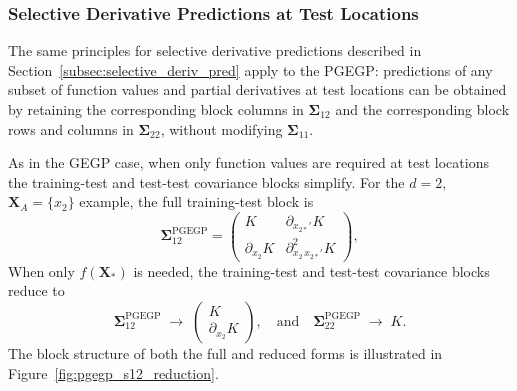 \documentclass[12pt]{article}
\begin{document}
\subsubsection{Selective Derivative Predictions at Test Locations}
\label{subsubsec:pgegp_selective_pred}

The same principles for selective derivative predictions described in Section~\ref{subsec:selective_deriv_pred} apply to the PGEGP: predictions of any subset of function values and partial derivatives at test locations can be obtained by retaining the corresponding block columns in $\boldsymbol{\Sigma}_{12}$ and the corresponding block rows and columns in $\boldsymbol{\Sigma}_{22}$, without modifying $\boldsymbol{\Sigma}_{11}$.

As in the GEGP case, when only function values are required at test locations the training-test and test-test covariance blocks simplify. For the $d=2$, $\mathbf{X}_A = \{x_2\}$ example, the full training-test block is
\begin{equation}
	\boldsymbol{\Sigma}_{12}^{\text{PGEGP}} =
	\begin{pmatrix}
		K & \partial_{x_{2*}'} K \\[8pt]
		\partial_{x_2} K & \partial^2_{x_2\,x_{2*}'} K
	\end{pmatrix},
\end{equation}
When only $f(\mathbf{X}_*)$ is needed, the training-test and test-test covariance blocks reduce to
\begin{equation}
	\boldsymbol{\Sigma}_{12}^{\text{PGEGP}} \;\longrightarrow\;
	\begin{pmatrix}
		K \\[12pt]
		\partial_{x_2} K
	\end{pmatrix}, \quad \text{and} \quad
	\boldsymbol{\Sigma}_{22}^{\text{PGEGP}} \;\longrightarrow\; K.
\end{equation}
The block structure of both the full and reduced forms is illustrated in Figure~\ref{fig:pgegp_s12_reduction}.
\end{document}
